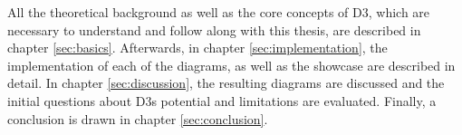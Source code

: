 All the theoretical background as well as the core concepts of D3, which are necessary to understand and follow along with this thesis, are described in chapter \ref{sec:basics}. Afterwards, in chapter \ref{sec:implementation}, the implementation of each of the diagrams, as well as the showcase are described in detail. In chapter \ref{sec:discussion}, the resulting diagrams are discussed and the initial questions about D3s potential and limitations are evaluated. Finally, a conclusion is drawn in chapter \ref{sec:conclusion}.
